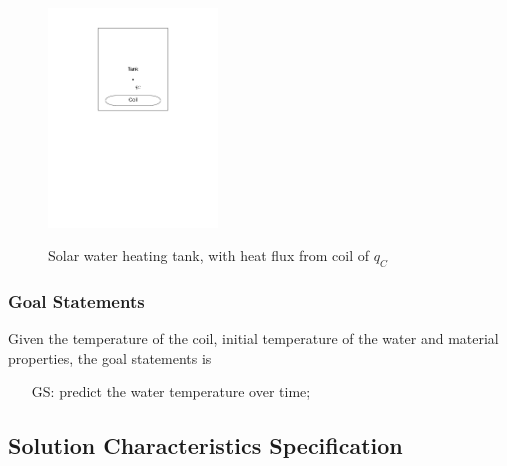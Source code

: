 \documentclass[12pt]{article}
\newcounter{goalnum} %
\begin{document}
\begin{figure}[h!]
\begin{center}
{
 \includegraphics[width=0.4\textwidth]{TankWaterOnly.pdf}
}
\caption{\label{Fig_Tank} Solar water heating tank, with heat flux from coil of $q_C$}
\end{center}
\end{figure}

\subsubsection{Goal Statements}

\noindent Given the temperature of the coil, initial temperature of 
the water
and material properties, the goal statements is

\begin{itemize}

\item[GS\refstepcounter{goalnum}\thegoalnum \label{G_wtemp}:] predict the water 
temperature over time;

	


\end{itemize}

\subsection{Solution Characteristics Specification}
\end{document}
